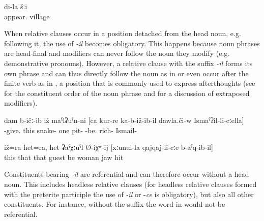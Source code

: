 \begin{exe}
	\ex	\label{ex:the village where I was born}
	\gll	[du	hak'-ub-il]	di-la	šːi\\
			appear.		village\\
	\glt	{}
\end{exe}

When relative clauses occur in a position detached from the head noun, e.g. following it, the use of \textit{-il} becomes obligatory. This happens because noun phrases are head-final and modifiers can never follow the noun they modify (e.g. demonstrative pronouns). However, a relative clause with the suffix \textit{-il} forms its own phrase and can thus directly follow the noun as in  or even occur after the finite verb as in , a position that is commonly used to express afterthoughts (see  for the constituent order of the noun phrase and  for a discussion of extraposed modifiers).


\begin{exe}
	\ex	\label{ex:The snake who sat in a pit together with the rich}
	\gll	dam	b-ičː-ib	iž	maˁlʡuˁn-ni	[ca	kur-re	ka-b-iž-ib-il	dawla.či-w	Ismaˁʔil-li-cːella]	\\
			-give.	this	snake-	one	pit-	-be.	rich-	Ismail-\\
	\glt	{}

	\ex	\label{ex:‎This also and this also is probably the man}
	\gll	iž=ra	het=ra,	het	ʡaˁχːuˁl	Ø-iχʷ-ij	[xːunul-la	qajqaj-li-cːe	b-aˁq-ib-il]\\
		this	that	that	guest	be	woman	jaw	hit\\
	\glt	{}
	
\end{exe}


Constituents bearing \textit{-il} are referential and can therefore occur without a head noun. This includes headless relative clauses (for headless relative clauses formed with the preterite participle the use of \textit{-il} or -\textit{ce} is obligatory), but also all other constituents. For instance, without the suffix the word in  would not be referential.

